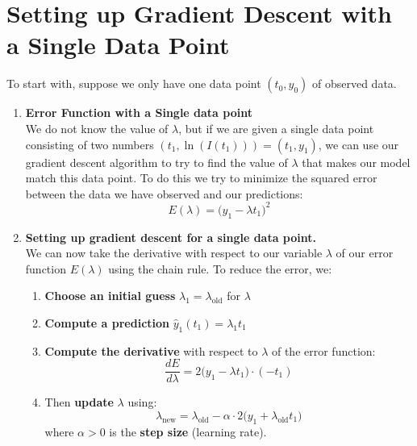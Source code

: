 \documentclass[11pt]{article}
\begin{document}
\section*{Setting up Gradient Descent with a Single Data Point}
To start with, suppose we only have one data point $(t_0,y_0)$ of observed data.
\begin{enumerate}

\item \textbf{Error Function with a Single data point}\\

We do not know the value of $\lambda$, but if we are given a single  data point consisting of two numbers $(t_1,\ln(I(t_1))) = (t_1,y_1)$,
we can use our gradient descent algorithm to try to find the value of $\lambda$ that makes our model match this data point. To do this we try to minimize the squared error between the data we have observed and our predictions:
\[
E(\lambda) = \big(y_1 - \lambda t_1\big)^2
\]
\item \textbf{Setting up gradient descent for a single data point.}\\
    We can now take the derivative with respect to our variable $\lambda$ of our error function $E(\lambda)$ using the chain rule.
    To reduce the error, we:
    \begin{enumerate}
    \item[(a)] \textbf{Choose an initial guess} $\lambda_1 = \lambda_{\text{old}}$ for $\lambda$\\
    \item[(b)] \textbf{Compute a prediction} $\hat{y}_1(t_1) = \lambda_1 t_1$\\

    \item[(c)] \textbf{Compute the derivative} with respect to $\lambda$ of the error function:
    \[
    \frac{dE}{d \lambda} = 2\big(y_1 - \lambda t_1\big) \cdot (-t_1)
    \]
    \item[(d)] Then \textbf{update} $\lambda$ using:
    \[
    \lambda_{\text{new}} = \lambda_{\text{old}} - \alpha \cdot 2\big(y_1 + \lambda_{\text{old}}t_1\big)
    \]
    where $\alpha > 0$ is the \textbf{step size} (learning rate).
    \end{enumerate}
    \vspace{0.5cm}
    

\end{enumerate}
\end{document}

